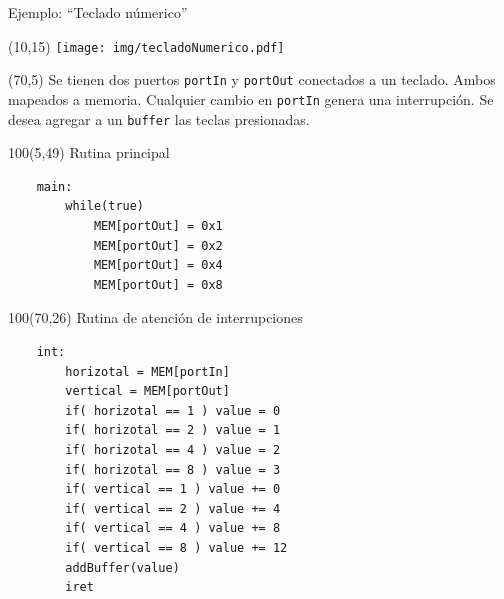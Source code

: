 \documentclass[aspectratio=169]{beamer}
\begin{document}
\begin{frame}[fragile,t]{Ejemplo: ``Teclado númerico''}
    \begin{textblock}{60}(10,15)
    \texttt{[image: img/tecladoNumerico.pdf]}\\
    \end{textblock}
    \begin{textblock}{80}(70,5)
    \small Se tienen dos puertos \texttt{portIn} y \texttt{portOut}
    conectados a un teclado. Ambos mapeados a memoria. Cualquier cambio en \texttt{portIn} genera una interrupción.
    Se desea agregar a un \texttt{buffer} las teclas presionadas.
    \end{textblock}
    \begin{textblock}{100}(5,49)
    \textcolor{naranjauca}{Rutina principal}
    \small
    \vspace{-0.2cm}
    \begin{verbatim}
    main:
        while(true)
            MEM[portOut] = 0x1
            MEM[portOut] = 0x2
            MEM[portOut] = 0x4
            MEM[portOut] = 0x8
    \end{verbatim}
    \end{textblock}        
    \begin{textblock}{100}(70,26)
    \textcolor{naranjauca}{Rutina de atención de interrupciones}
    \small
    \vspace{-0.2cm}
    \begin{verbatim}
    int:
        horizotal = MEM[portIn]
        vertical = MEM[portOut]
        if( horizotal == 1 ) value = 0
        if( horizotal == 2 ) value = 1
        if( horizotal == 4 ) value = 2
        if( horizotal == 8 ) value = 3
        if( vertical == 1 ) value += 0
        if( vertical == 2 ) value += 4
        if( vertical == 4 ) value += 8
        if( vertical == 8 ) value += 12
        addBuffer(value)
        iret
    \end{verbatim}
    \end{textblock}
\end{frame}
\end{document}
